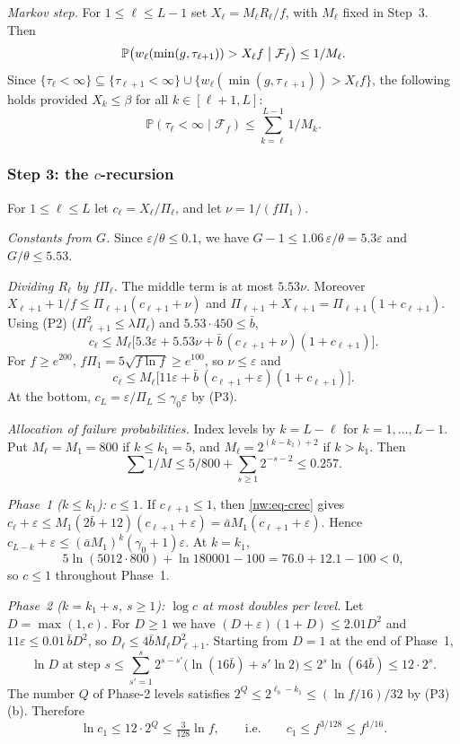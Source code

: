 \documentclass[11pt]{amsart}
\theoremstyle{definition}
\theoremstyle{remark}
\newcommand{\eps}{\varepsilon}
\newcommand{\PP}{\mathbb{P}}
\newcommand{\cF}{\mathcal{F}}
\begin{document}
\emph{Markov step.} For $1\le\ell\le L-1$ set $X_\ell=M_\ell R_\ell/f$, with
$M_\ell$ fixed in Step~3. Then
\[
  \PP\bigl(w_\ell(\min(g,\tau_{\ell+1}))>X_\ell f\bigm|\cF_f\bigr)
  \le1/M_\ell.
\]
Since $\{\tau_\ell<\infty\}\subseteq\{\tau_{\ell+1}<\infty\}\cup
\{w_\ell(\min(g,\tau_{\ell+1}))>X_\ell f\}$, the following holds provided
$X_k\le\beta$ for all $k\in[\ell+1,L]$:
\begin{equation}\label{nw:eq-tau}
  \PP(\tau_\ell<\infty\mid\cF_f)\le\sum_{k=\ell}^{L-1}1/M_k.
\end{equation}

\subsubsection{Step 3: the $c$-recursion}
For $1\le\ell\le L$ let $c_\ell=X_\ell/\Pi_\ell$, and let $\nu=1/(f\Pi_1)$.

\emph{Constants from $G$.} Since $\eps/\theta\le0.1$, we have
$G-1\le1.06\,\eps/\theta=5.3\eps$ and $G/\theta\le5.53$.

\emph{Dividing $R_\ell$ by $f\Pi_\ell$.} The middle term is at most
$5.53\nu$. Moreover $X_{\ell+1}+1/f\le\Pi_{\ell+1}(c_{\ell+1}+\nu)$ and
$\Pi_{\ell+1}+X_{\ell+1}=\Pi_{\ell+1}(1+c_{\ell+1})$. Using (P2)
($\Pi_{\ell+1}^2\le\lambda\Pi_\ell$) and $5.53\cdot450\le\bar b$,
\[
  c_\ell\le M_\ell\bigl[5.3\eps+5.53\nu+\bar b\,(c_{\ell+1}+\nu)(1+c_{\ell+1})
  \bigr].
\]
For $f\ge e^{200}$, $f\Pi_1=5\sqrt{f\ln f}\ge e^{100}$, so $\nu\le\eps$ and
\begin{equation}\label{nw:eq-crec}
  c_\ell\le M_\ell\bigl[11\eps+\bar b\,(c_{\ell+1}+\eps)(1+c_{\ell+1})\bigr].
\end{equation}
At the bottom, $c_L=\eps/\Pi_L\le\gamma_0\eps$ by (P3).

\emph{Allocation of failure probabilities.} Index levels by $k=L-\ell$ for
$k=1,\dots,L-1$. Put $M_\ell=M_1=800$ if $k\le k_1=5$, and
$M_\ell=2^{(k-k_1)+2}$ if $k>k_1$. Then
\[
  \sum1/M\le5/800+\sum_{s\ge1}2^{-s-2}\le0.257.
\]

\emph{Phase~1 ($k\le k_1$): $c\le1$.} If $c_{\ell+1}\le1$, then
\eqref{nw:eq-crec} gives
$c_\ell+\eps\le M_1(2\bar b+12)(c_{\ell+1}+\eps)=\bar aM_1(c_{\ell+1}+\eps)$.
Hence $c_{L-k}+\eps\le(\bar aM_1)^k(\gamma_0+1)\eps$. At $k=k_1$,
\[
  5\ln(5012\cdot800)+\ln180001-100=76.0+12.1-100<0,
\]
so $c\le1$ throughout Phase~1.

\emph{Phase~2 ($k=k_1+s$, $s\ge1$): $\log c$ at most doubles per level.} Let
$D=\max(1,c)$. For $D\ge1$ we have $(D+\eps)(1+D)\le2.01D^2$ and
$11\eps\le0.01\,\bar bD^2$, so $D_\ell\le4\bar bM_\ell D_{\ell+1}^2$. Starting
from $D=1$ at the end of Phase~1,
\[
  \ln D\text{ at step }s\le\sum_{s'=1}^{s}2^{s-s'}\bigl(\ln(16\bar b)
  +s'\ln2\bigr)\le2^s\ln(64\bar b)\le12\cdot2^s.
\]
The number $Q$ of Phase-2 levels satisfies
$2^Q\le2^{\ell_b-k_1}\le(\ln f/16)/32$ by (P3)(b). Therefore
\begin{equation}\label{nw:eq-c1}
  \ln c_1\le12\cdot2^Q\le\tfrac{3}{128}\ln f,\qquad\text{i.e.}\qquad
  c_1\le f^{3/128}\le f^{1/16}.
\end{equation}
\end{document}
